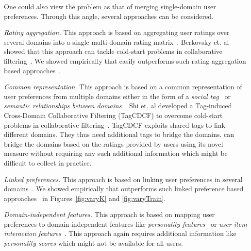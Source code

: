  One could also view the 
problem as that of merging single-domain user preferences. Through this angle, several approaches can be considered.

{\it Rating aggregation.} This approach is based on aggregating user ratings over several domains into a single multi-domain rating matrix~\cite{berkovsky2007distributed,winoto2008if, berkovsky2007cross}. Berkovsky et. al showed that this approach can tackle cold-start problems in collaborative filtering~\cite{berkovsky2007distributed}. We showed empirically that \crossrec easily outperforms such rating aggregation based approaches~\cite{berkovsky2007cross}.

{\it Common representation.} This approach is based on a common representation of user preferences from multiple domains either in the form of a \emph{social tag}~\cite{szomszor2008correlating,szomszor2008semantic} or \emph{semantic relationships between domains}~\cite{loizou2009recommend}. Shi et. al developed a Tag-induced  Cross-Domain Collaborative Filtering (TagCDCF) to overcome cold-start problems in collaborative filtering~\cite{shi2011tags}. TagCDCF exploits shared tags to link different domains. They thus need additional tags to bridge the domains. \crossrec can bridge the domains based on the ratings provided by users using its novel \graphsim measure without requiring any such additional information which might be difficult to collect in practice.

{\it Linked preferences.} This approach is based on linking user preferences in several domains~\cite{nakatsuji2010recommendations, cremonesi2011cross}. We showed empirically that \crossrec  outperforms such linked preference based approaches~\cite{cremonesi2011cross} in Figures~\ref{fig:varyK} and \ref{fig:varyTrain}.

{\it Domain-independent features.} This approach is based on mapping user preferences to domain-independent features like \emph{personality features}~\cite{cantador2013relating} or \emph{user-item interaction features}~\cite{loni2014cross}. This approach again requires additional information like \emph{personality scores} which might not be available for all users. 
















